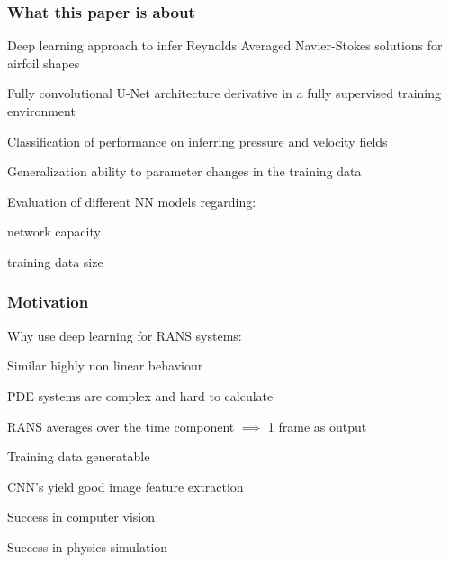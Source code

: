 \begin{frame}
    \frametitle{What this paper is about}
	\vspace*{0.8cm}

Deep learning approach to infer Reynolds Averaged Navier-Stokes \newline solutions for airfoil shapes

Fully convolutional U-Net architecture derivative in a fully \newline supervised training environment

Classification of performance on inferring pressure and velocity fields

Generalization ability to parameter changes in the training data

Evaluation of different NN models regarding:
\begin{PraesentationAufzaehlung}
    \item network capacity
    \item training data size
\end{PraesentationAufzaehlung}

\end{frame}
\clearpage

\begin{frame}
    \frametitle{Motivation}
	\vspace*{0.8cm}
	
Why use deep learning for RANS systems:

\begin{PraesentationAufzaehlung}
    \item Similar highly non linear behaviour
    \item PDE systems are complex and hard to calculate
    \item RANS averages over the time component \newline $\implies$ 1 frame as output
    \item Training data generatable
    \item CNN's yield good image feature extraction
    \item Success in computer vision
    \item Success in physics simulation
\end{PraesentationAufzaehlung}

\end{frame}
\clearpage